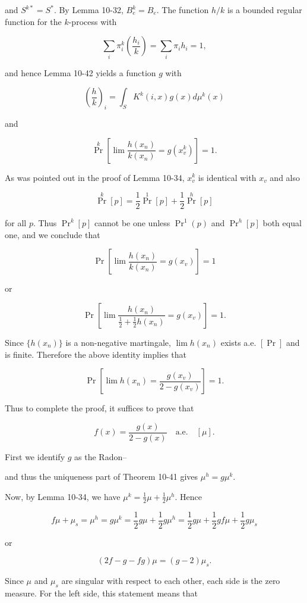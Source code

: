 

and $S^{k*} = S^*$. By Lemma 10-32, $B_e^k = B_e$. The function $h/k$ is a bounded regular function for the $k$-process with

$$\sum_i \pi_i^k \left( \frac{h_i}{k} \right) = \sum_i \pi_i h_i = 1,$$

and hence Lemma 10-42 yields a function $g$ with

$$\left( \frac{h}{k} \right)_i = \int_S K^k(i, x)g(x)d\mu^k(x)$$

and

$$\Pr^k \left[ \lim \frac{h(x_n)}{k(x_n)} = g(x_v^k) \right] = 1.$$

As was pointed out in the proof of Lemma 10-34, $x_v^k$ is identical with $x_v$ and also

$$\Pr^k[p] = \frac{1}{2} \Pr^1[p] + \frac{1}{2} \Pr^h[p]$$

for all $p$. Thus $\Pr^k[p]$ cannot be one unless $\Pr^1(p)$ and $\Pr^h[p]$ both equal one, and we conclude that

$$\Pr \left[ \lim \frac{h(x_n)}{k(x_n)} = g(x_v) \right] = 1$$

or

$$\Pr \left[ \lim \frac{h(x_n)}{\frac{1}{2} + \frac{1}{2}h(x_n)} = g(x_v) \right] = 1.$$

Since $\{h(x_n)\}$ is a non-negative martingale, $\lim h(x_n)$ exists a.e. $[\Pr]$ and is finite. Therefore the above identity implies that

$$\Pr \left[ \lim h(x_n) = \frac{g(x_v)}{2 - g(x_v)} \right] = 1.$$

Thus to complete the proof, it suffices to prove that

$$f(x) = \frac{g(x)}{2 - g(x)} \quad \text{a.e.} \quad [\mu].$$

First we identify $g$ as the Radon–

and thus the uniqueness part of Theorem 10-41 gives $\mu^h = g\mu^k$.

Now, by Lemma 10-34, we have $\mu^k = \frac{1}{2}\mu + \frac{1}{2}\mu^h$. Hence

$$f\mu + \mu_s = \mu^h = g\mu^k = \frac{1}{2}g\mu + \frac{1}{2}g\mu^h = \frac{1}{2}g\mu + \frac{1}{2}gf\mu + \frac{1}{2}g\mu_s$$

or

$$(2f - g - fg)\mu = (g - 2)\mu_s.$$

Since $\mu$ and $\mu_s$ are singular with respect to each other, each side is the zero measure. For the left side, this statement means that


